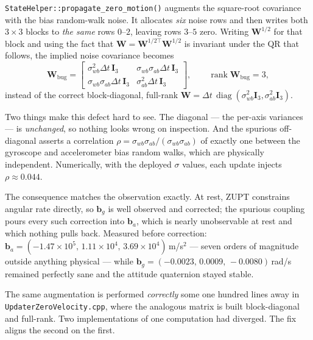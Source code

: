 \texttt{StateHelper::propagate\_zero\_motion()} augments the square-root
covariance with the bias random-walk noise. It allocates \emph{six} noise rows
and then writes both $3\times3$ blocks to \emph{the same} rows $0$--$2$, leaving
rows $3$--$5$ zero. Writing $\mathbf{W}^{1/2}$ for that block and using the fact
that $\mathbf{W}=\mathbf{W}^{1/2\top}\mathbf{W}^{1/2}$ is invariant under the QR
that follows, the implied noise covariance becomes
%
\begin{equation}
  \mathbf{W}_{\text{bug}} =
  \begin{bmatrix}
    \sigma_{wb}^{2}\Delta t\,\mathbf{I}_{3} & \sigma_{wb}\sigma_{ab}\Delta t\,\mathbf{I}_{3}\\[2pt]
    \sigma_{wb}\sigma_{ab}\Delta t\,\mathbf{I}_{3} & \sigma_{ab}^{2}\Delta t\,\mathbf{I}_{3}
  \end{bmatrix},
  \qquad
  \operatorname{rank}\mathbf{W}_{\text{bug}} = 3 ,
  \label{eq:wbug}
\end{equation}
%
instead of the correct block-diagonal, full-rank
$\mathbf{W}=\Delta t\,\operatorname{diag}(\sigma_{wb}^{2}\mathbf{I}_{3},
\sigma_{ab}^{2}\mathbf{I}_{3})$.

Two things make this defect hard to see. The diagonal --- the per-axis
variances --- is \emph{unchanged}, so nothing looks wrong on inspection. And
the spurious off-diagonal asserts a correlation
$\rho = \sigma_{wb}\sigma_{ab}/(\sigma_{wb}\sigma_{ab}) $ of exactly one
between the gyroscope and accelerometer bias random walks, which are physically
independent. Numerically, with the deployed $\sigma$ values, each update
injects $\rho \approx 0.044$.

The consequence matches the observation exactly. At rest, ZUPT constrains
angular rate directly, so $\mathbf{b}_{g}$ is well observed and corrected; the
spurious coupling pours every such correction into $\mathbf{b}_{a}$, which is
nearly unobservable at rest and which nothing pulls back. Measured before
correction: $\mathbf{b}_{a} = (-1.47\times10^{5},\,1.11\times10^{4},\,
3.69\times10^{4})$\,m/s$^{2}$ --- seven orders of magnitude outside anything
physical --- while $\mathbf{b}_{g}=(-0.0023,\,0.0009,\,-0.0080)$\,rad/s
remained perfectly sane and the attitude quaternion stayed stable.

The same augmentation is performed \emph{correctly} some one hundred lines away
in \texttt{UpdaterZeroVelocity.cpp}, where the analogous matrix is built
block-diagonal and full-rank. Two implementations of one computation had
diverged. The fix aligns the second on the first.

